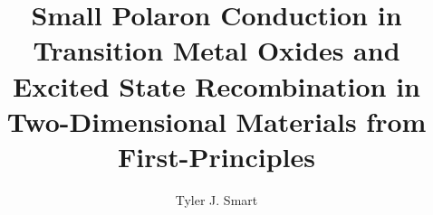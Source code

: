 \documentclass[12pt]{../include/ucthesis}
\begin{document}
\title{Small Polaron Conduction in Transition Metal Oxides and Excited State Recombination in Two-Dimensional Materials from First-Principles}
\author{Tyler J. Smart}
\deanlinethree{}

\begin{frontmatter}
\maketitle

\copyrightpage

\tableofcontents

\listoffigures

\listoftables





\end{frontmatter}

















% 
% 
% 
% 
% 
\end{document}
